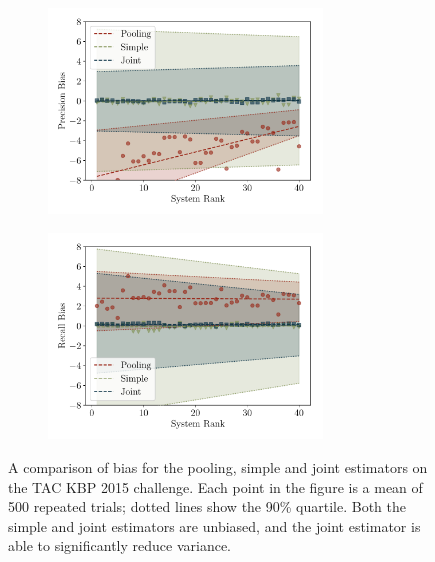 \begin{figure}[!h]
  \centering

  \begin{subfigure}{\textwidth}
    \centering
    \includegraphics[width=0.8\textwidth]{figures/simulation/simulation-p}
    \caption{}
  \end{subfigure}

  \begin{subfigure}{\textwidth}
    \centering
    \includegraphics[width=0.8\textwidth]{figures/simulation/simulation-r}
    \caption{}
  \end{subfigure}

  \caption[Reduction of variance with the importance-reweighted estimator]{\label{fig:kbpo:simulation}
  A comparison of bias for the pooling, simple and joint estimators on the TAC KBP 2015 challenge.
  Each point in the figure is a mean of 500 repeated trials; dotted lines show the 90\% quartile.
  Both the simple and joint estimators are unbiased, and the joint estimator is able to significantly reduce variance.
  }
\end{figure}


